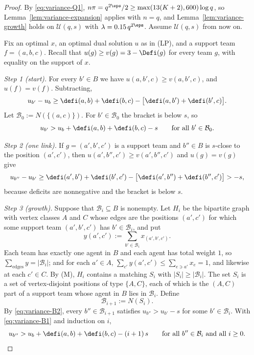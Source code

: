 \begin{proof}
By \eqref{eq:variance-Q1}, $n\pi=q^{2\eps}/2\ge\max(13(K+2),600)\log q$, so
Lemma~\ref{lem:variance-expansion} applies with $n=q$, and
Lemma~\ref{lem:variance-growth} holds on $\mathcal U(q,s)$ with
$\lambda=0.15\,q^{2\eps}$. Assume $\mathcal U(q,s)$ from now on.

Fix an optimal $x$, an optimal dual solution $u$ as in (LP), and a support team
$f=(a,b,c)$. Recall that $u(g)\ge v(g)=3-\Defi(g)$ for every team $g$, with equality on
the support of $x$.

\emph{Step 1 (start).} For every $b'\in B$ we have $u(a,b',c)\ge v(a,b',c)$, and
$u(f)=v(f)$. Subtracting,
\[
u_{b'}-u_b\ge\defi(a,b)+\defi(b,c)-\bigl[\defi(a,b')+\defi(b',c)\bigr].
\]
Let $\mathcal B_0:=N(\{(a,c)\})$. For $b'\in\mathcal B_0$ the bracket is below $s$, so
\begin{equation}\label{eq:variance-B1}
u_{b'}>u_b+\defi(a,b)+\defi(b,c)-s\qquad\text{for all }b'\in\mathcal B_0 .
\end{equation}

\emph{Step 2 (one link).} If $g=(a',b',c')$ is a support team and $b''\in B$ is $s$-close
to the position $(a',c')$, then $u(a',b'',c')\ge v(a',b'',c')$ and $u(g)=v(g)$ give
\begin{equation}\label{eq:variance-B2}
u_{b''}-u_{b'}\ge\defi(a',b')+\defi(b',c')-\bigl[\defi(a',b'')+\defi(b'',c')\bigr]>-s,
\end{equation}
because deficits are nonnegative and the bracket is below $s$.

\emph{Step 3 (growth).} Suppose that $\mathcal B_i\subseteq B$ is nonempty. Let $H_i$ be
the bipartite graph with vertex classes $A$ and $C$ whose edges are the positions
$(a',c')$ for which some support team $(a',b',c')$ has $b'\in\mathcal B_i$, and put
\[
y(a',c'):=\sum_{b'\in\mathcal B_i}x_{(a',b',c')} .
\]
Each team has exactly one agent in $B$ and each agent has total weight $1$, so
$\sum_{\text{edges}}y=|\mathcal B_i|$; and for each $a'\in A$,
$\sum_{c'}y(a',c')\le\sum_{e\ni a'}x_e=1$, and likewise at each $c'\in C$. By (M), $H_i$
contains a matching $S_i$ with $|S_i|\ge|\mathcal B_i|$. The set $S_i$ is a set of
vertex-disjoint positions of type $\{A,C\}$, each of which is the $(A,C)$ part of a support
team whose agent in $B$ lies in $\mathcal B_i$. Define
\[
\mathcal B_{i+1}:=N(S_i).
\]
By \eqref{eq:variance-B2}, every $b''\in\mathcal B_{i+1}$ satisfies $u_{b''}>u_{b'}-s$ for
some $b'\in\mathcal B_i$. With \eqref{eq:variance-B1} and induction on $i$,
\begin{equation}\label{eq:variance-B3}
u_{b''}>u_b+\defi(a,b)+\defi(b,c)-(i+1)\,s\qquad\text{for all }b''\in\mathcal B_i
\text{ and all }i\ge0 .
\end{equation}


\end{proof}
